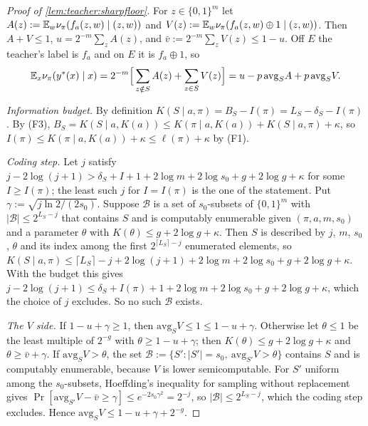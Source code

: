 \begin{proof}[Proof of \cref{lem:teacher:sharpfloor}]
For $z\in\{0,1\}^m$ let $A(z):=\mathbb{E}_w\nu_\pi(f_a(z,w)\mid(z,w))$ and $V(z):=\mathbb{E}_w\nu_\pi(f_a(z,w)\oplus1\mid(z,w))$. Then $A+V\le1$, $u=2^{-m}\sum_zA(z)$, and $\bar v:=2^{-m}\sum_zV(z)\le1-u$. Off $E$ the teacher's label is $f_a$ and on $E$ it is $f_a\oplus1$, so
\begin{equation}\label{eq:teacher:identity}
\mathbb{E}_x\nu_\pi(y^*(x)\mid x)=2^{-m}\Big[\sum_{z\notin S}A(z)+\sum_{z\in S}V(z)\Big]=u-p\,\mathrm{avg}_SA+p\,\mathrm{avg}_SV.
\end{equation}

\emph{Information budget.} By definition $K(S\mid a,\pi)=B_S-I(\pi)=L_S-\delta_S-I(\pi)$. By (F3), $B_S=K(S\mid a,K(a))\le K(\pi\mid a,K(a))+K(S\mid a,\pi)+\kappa$, so $I(\pi)\le K(\pi\mid a,K(a))+\kappa\le\ell(\pi)+\kappa$ by (F1).

\emph{Coding step.} Let $j$ satisfy $j-2\log(j+1)>\delta_S+I+1+2\log m+2\log s_0+g+2\log g+\kappa$ for some $I\ge I(\pi)$; the least such $j$ for $I=I(\pi)$ is the one of the statement. Put $\gamma:=\sqrt{j\ln2/(2s_0)}$. Suppose $\mathcal B$ is a set of $s_0$-subsets of $\{0,1\}^m$ with $|\mathcal B|\le2^{L_S-j}$ that contains $S$ and is computably enumerable given $(\pi,a,m,s_0)$ and a parameter $\theta$ with $K(\theta)\le g+2\log g+\kappa$. Then $S$ is described by $j$, $m$, $s_0$, $\theta$ and its index among the first $2^{\lceil L_S\rceil-j}$ enumerated elements, so $K(S\mid a,\pi)\le\lceil L_S\rceil-j+2\log(j+1)+2\log m+2\log s_0+g+2\log g+\kappa$. With the budget this gives $j-2\log(j+1)\le\delta_S+I(\pi)+1+2\log m+2\log s_0+g+2\log g+\kappa$, which the choice of $j$ excludes. So no such $\mathcal B$ exists.

\emph{The $V$ side.} If $1-u+\gamma\ge1$, then $\mathrm{avg}_SV\le1\le1-u+\gamma$. Otherwise let $\theta\le1$ be the least multiple of $2^{-g}$ with $\theta\ge1-u+\gamma$; then $K(\theta)\le g+2\log g+\kappa$ and $\theta\ge\bar v+\gamma$. If $\mathrm{avg}_SV>\theta$, the set $\mathcal B:=\{S':|S'|=s_0,\ \mathrm{avg}_{S'}V>\theta\}$ contains $S$ and is computably enumerable, because $V$ is lower semicomputable. For $S'$ uniform among the $s_0$-subsets, Hoeffding's inequality for sampling without replacement \citep{hoeffding1963probability} gives $\Pr[\mathrm{avg}_{S'}V-\bar v\ge\gamma]\le e^{-2s_0\gamma^2}=2^{-j}$, so $|\mathcal B|\le2^{L_S-j}$, which the coding step excludes. Hence $\mathrm{avg}_SV\le1-u+\gamma+2^{-g}$.


\end{proof}
